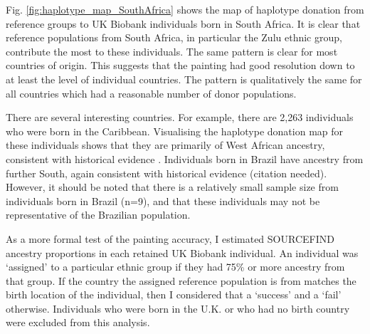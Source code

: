 Fig. \ref{fig:haplotype_map_SouthAfrica} shows the map of haplotype donation from reference groups to UK Biobank individuals born in South Africa. It is clear that reference populations from South Africa, in particular the Zulu ethnic group, contribute the most to these individuals. The same pattern is clear for most countries of origin. This suggests that the painting had good resolution down to at least the level of individual countries. The pattern is qualitatively the same for all countries which had a reasonable number of donor populations. 

There are several interesting countries. For example, there are 2,263 individuals who were born in the Caribbean. Visualising the haplotype donation map for these individuals shows that they are primarily of West African ancestry, consistent with historical evidence \cite{micheletti2020genetic}. Individuals born in Brazil have ancestry from further South, again consistent with historical evidence (citation needed). However, it should be noted that there is a relatively small sample size from individuals born in Brazil (n=9), and that these individuals may not be representative of the Brazilian population. 

As a more formal test of the painting accuracy, I estimated SOURCEFIND ancestry proportions in each retained UK Biobank individual. An individual was `assigned' to a particular ethnic group if they had 75\% or more ancestry from that group. If the country the assigned reference population is from matches the birth location of the individual, then I considered that a `success' and a `fail' otherwise. Individuals who were born in the U.K. or who had no birth country were excluded from this analysis. 

